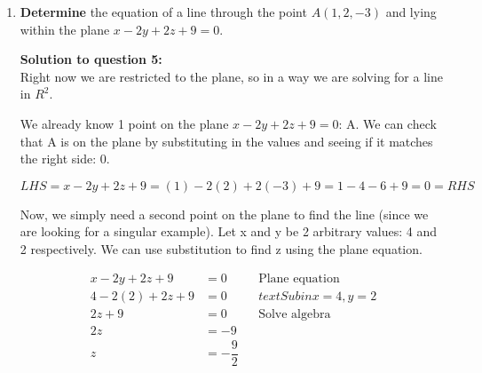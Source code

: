 \documentclass[12pt]{book}
\begin{document}
\begin{enumerate}
\begin{proof}
\vspace{-1cm}
We know that $\cos \theta = \dfrac{\vec{a} \cdot \vec{b}}{|\vec{a}||\vec{b}|}$. Therefore $\cos^2 \theta = \left(\dfrac{\vec{a} \cdot \vec{b}}{|\vec{a}||\vec{b}|} \right)^2 = \dfrac{(\vec{a} \cdot \vec{b})^2}{(|\vec{a}||\vec{b}|)^2}.$

\addtolength{\jot}{1em}
\begin{align*}
  LHS &= \dfrac{(\vec{a} \cdot \vec{b})^2}{(|\vec{a}||\vec{b}|)^2}(\vec{a} \cdot \vec{b}) \\
  LHS &= \cos^2 \theta(\vec{a} \cdot \vec{b}) = RHS && \text{Substitute identity in}\\
\end{align*}
  
\begin{center}
  $\boxed{ \text{ Therefore the statement } proj_{\vec{a}}\vec{b} \cdot proj_{\vec{b}}\vec{a} = (\vec{a} \cdot \vec{b}) \cos^2(\theta) \text{ is true. }}$
\end{center}
\end{proof}

\newpage

\item \textbf{Determine} the equation of a line through the point $A(1,2,-3)$ and lying within the plane $x-2y+2z+9=0$.

\vspace{0.3cm} 
\textbf{Solution to question 5:}\\
Right now we are restricted to the plane, so in a way we are solving for a line in $R^2$.

We already know 1 point on the plane $x-2y+2z+9=0$: A. We can check that A is on 
the plane by substituting in the values and seeing if it matches the right side: 0.

$$LHS = x-2y+2z+9 = (1)-2(2)+2(-3)+9 = 1 - 4 - 6 + 9 = 0 = RHS$$

Now, we simply need a second point on the plane to find the line (since we 
are looking for a singular example). Let x and y be 2 arbitrary values: 4 
and 2 respectively. We can use substitution to find z using the plane equation.

\addtolength{\jot}{0.1em}
\begin{align*}
  x-2y+2z+9 &= 0 && \text{Plane equation}\\
  4 - 2(2) + 2z + 9 &= 0 && text{Sub in x=4, y=2}\\
  2z + 9 &= 0 && \text{Solve algebra}\\
  2z &= -9 \\
  z &= -\dfrac{9}{2} \\
\end{align*}


\end{enumerate}
\end{document}
